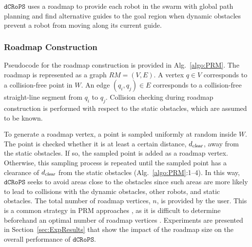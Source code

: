 \documentclass[letterpaper, 10pt, conference]{ieeeconf}
\newcommand{\Acronym}[1]{\ensuremath{{{\texttt{#1}}}}}
\newcommand{\Var}[1]{\ensuremath{{{\textsl{#1}}}}}
\newcommand{\Name}{\Acronym{dCRoPS}}
\newcommand{\mychange}[1]{\textcolor{red}{#1}}
\begin{document}
$\Name$ uses a roadmap to provide each robot in the swarm with global
path planning and find alternative guides to the goal region when dynamic
obstacles prevent a robot from moving along its current guide.

\subsubsection{Roadmap Construction}
\label{sec:RoadmapConstruction}
Pseudocode for the roadmap construction is provided in Alg.~\ref{algo:PRM}.
The roadmap is represented as a graph $RM=(V,E)$. A vertex $q \in V$
corresponds to a collision-free point in $W$. An edge
$(q_i, q_j) \in E$ corresponds to a collision-free straight-line
segment from $q_i$ to $q_j$.  Collision checking during roadmap
construction is performed with respect to the static obstacles, which
are assumed to be known.


To generate a roadmap vertex, a point is sampled uniformly at random
inside $W$. The point is checked whether it is at least a certain
distance, $d_\Var{clear}$, away from the static obstacles. If so, the
sampled point is added as a roadmap vertex. Otherwise, this sampling
process is repeated until the sampled point has a clearance of
$d_\Var{clear}$ from the static obstacles (Alg.~\ref{algo:PRM}:1--4).
In this way, $\Name$ seeks to avoid areas close to the obstacles since
such areas are more likely to lead to collisions with the dynamic
obstacles, other robots, and static obstacles.  The total number of
roadmap vertices, $n$, is provided by the user.  This is a common
strategy in PRM approaches \cite{PRM,book:MP}, as it is difficult to
determine beforehand an optimal number of roadmap vertices
\cite{IncrementalPRM}.  Experiments are presented in
Section~\ref{sec:ExpResults} that show the impact of the roadmap size
on the overall performance of $\Name$.

\end{document}
